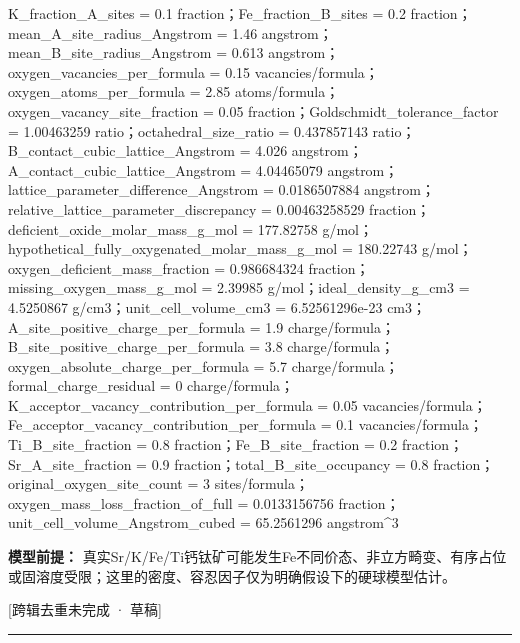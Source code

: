 \documentclass[UTF8,11pt,a4paper]{ctexart}
\begin{document}
K\_fraction\_A\_sites = 0.1 fraction；Fe\_fraction\_B\_sites = 0.2 fraction；mean\_A\_site\_radius\_Angstrom = 1.46 angstrom；mean\_B\_site\_radius\_Angstrom = 0.613 angstrom；oxygen\_vacancies\_per\_formula = 0.15 vacancies/formula；oxygen\_atoms\_per\_formula = 2.85 atoms/formula；oxygen\_vacancy\_site\_fraction = 0.05 fraction；Goldschmidt\_tolerance\_factor = 1.00463259 ratio；octahedral\_size\_ratio = 0.437857143 ratio；B\_contact\_cubic\_lattice\_Angstrom = 4.026 angstrom；A\_contact\_cubic\_lattice\_Angstrom = 4.04465079 angstrom；lattice\_parameter\_difference\_Angstrom = 0.0186507884 angstrom；relative\_lattice\_parameter\_discrepancy = 0.00463258529 fraction；deficient\_oxide\_molar\_mass\_g\_mol = 177.82758 g/mol；hypothetical\_fully\_oxygenated\_molar\_mass\_g\_mol = 180.22743 g/mol；oxygen\_deficient\_mass\_fraction = 0.986684324 fraction；missing\_oxygen\_mass\_g\_mol = 2.39985 g/mol；ideal\_density\_g\_cm3 = 4.5250867 g/cm3；unit\_cell\_volume\_cm3 = 6.52561296e-23 cm3；A\_site\_positive\_charge\_per\_formula = 1.9 charge/formula；B\_site\_positive\_charge\_per\_formula = 3.8 charge/formula；oxygen\_absolute\_charge\_per\_formula = 5.7 charge/formula；formal\_charge\_residual = 0 charge/formula；K\_acceptor\_vacancy\_contribution\_per\_formula = 0.05 vacancies/formula；Fe\_acceptor\_vacancy\_contribution\_per\_formula = 0.1 vacancies/formula；Ti\_B\_site\_fraction = 0.8 fraction；Fe\_B\_site\_fraction = 0.2 fraction；Sr\_A\_site\_fraction = 0.9 fraction；total\_B\_site\_occupancy = 0.8 fraction；original\_oxygen\_site\_count = 3 sites/formula；oxygen\_mass\_loss\_fraction\_of\_full = 0.0133156756 fraction；unit\_cell\_volume\_Angstrom\_cubed = 65.2561296 angstrom\textasciicircum{}3\par
\noindent\textbf{模型前提：}
真实Sr/K/Fe/Ti钙钛矿可能发生Fe不同价态、非立方畸变、有序占位或固溶度受限；这里的密度、容忍因子仅为明确假设下的硬球模型估计。\par
\noindent\textcolor{red!65!black}{[跨辑去重未完成 · 草稿]} \par
\medskip\hrule\medskip
{}
\end{document}
